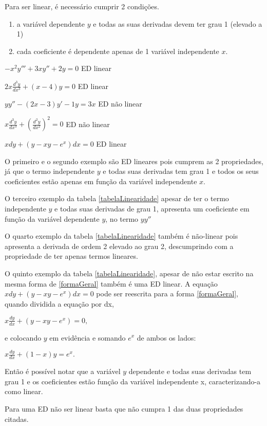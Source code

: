 Para ser linear, é necessário cumprir 2 condições. 
\begin{enumerate}
	\item{}a variável dependente $y$ e todas as suas derivadas devem ter grau 1 (elevado a 1)
	\item{}cada coeficiente é dependente apenas de 1 variável independente $x$.
\end{enumerate}


 $  -x^2y''' + 3xy'' + 2y = 0  $   ED linear

 $ 2x\frac{d^3y}{dx^3} + (x- 4)y = 0 $    ED linear  

 $ yy'' - (2x -3)y' - 1y  = 3x $  ED não linear 

 $ x\frac{d^3y}{dx^3} + (\frac{d^2y}{dx^2})^2 = 0 $  ED não linear 

 $ xdy + (y - xy - e^x)dx = 0 $  ED linear 
 
O primeiro e o segundo exemplo são ED lineares pois cumprem as 2 propriedades, já que o termo independente $y$ e todas suas derivadas tem grau 1 e todos os seus coeficientes estão apenas em função da variável independente $x$.

O terceiro exemplo da tabela \ref{tabelaLinearidade} apesar de ter o termo independente $y$ e todas suas derivadas de grau 1, apresenta um coeficiente em função da variável dependente $y$, no termo $ yy''$

O quarto exemplo da tabela \ref{tabelaLinearidade} também é não-linear pois apresenta a derivada de ordem 2 elevado ao grau 2, descumprindo com a propriedade de ter apenas termos lineares.

O quinto exemplo da tabela \ref{tabelaLinearidade}, apesar de não estar escrito na mesma forma de \ref{formaGeral} também é uma ED linear. A equação $ xdy + (y - xy - e^x)dx = 0 $ pode ser reescrita para a forma \ref{formaGeral}, quando dividida a equação por dx,
\begin{center}
$ x\frac{dy}{dx} + (y - xy - e^x) = 0, $ 
\end{center}
e colocando $y$ em evidência e somando $e^x$ de ambos os lados:
\begin{center}
$ x \frac{dy}{dx} + (1 - x)y =  e^x. $
\end{center}

Então é possível notar que a variável $y$ dependente e todas suas derivadas tem grau 1 e os coeficientes estão função da variável independente x, caracterizando-a como linear.

Para uma ED não ser linear basta que não cumpra 1 das duas propriedades citadas.

